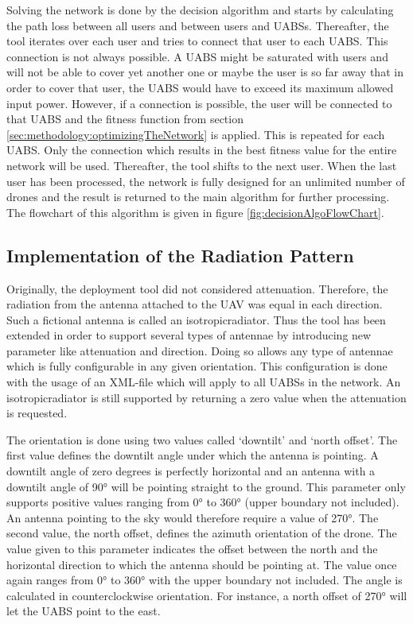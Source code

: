 \begin{minipage}{0.4\textwidth}\vspace{-120pt}%
Solving the network is done by the decision algorithm and starts by calculating the path loss between all users and between users and \gls{UABS}s.
Thereafter, the tool iterates over each user and tries to connect that user to each \gls{UABS}. This connection is not always possible. A \gls{UABS} might be saturated with users and 
will not be able to cover yet another one or maybe the user is so far away that in order to cover that user, the \gls{UABS} would have to exceed its maximum allowed input power.
However, if a connection is possible, the user will be connected to that \gls{UABS} and the fitness function from section \ref{sec:methodology:optimizingTheNetwork} is applied. 
This is repeated for each \gls{UABS}. Only the connection which results in the best fitness value for the entire network will be used. Thereafter, the tool shifts to the next user. 
When the last user has been processed, the network is fully designed for an unlimited number of drones and the result is returned to the main algorithm for further processing.
The flowchart of this algorithm is given in figure \ref{fig:decisionAlgoFlowChart}.
\end{minipage}

\FloatBarrier
\subsection{Implementation of the Radiation Pattern}
\label{subsec:implementationradpat}

Originally, the deployment tool  did not considered attenuation. 
Therefore, the radiation from the antenna attached to the \gls{UAV} 
was equal in each direction. Such a fictional antenna is called an \gls{isotropicradiator}. 
Thus the tool has been extended in order 
to support several types of antennae by introducing new parameter like attenuation and direction.
Doing so allows any type of antennae which is fully configurable in any given orientation.
This configuration is done with the usage of an XML-file which will apply to all \gls{UABS}s in the network.
An \gls{isotropicradiator} is still supported by returning 
a zero value when the attenuation is requested.

The orientation is done using two values called `downtilt' and `north offset'. The first value
defines the downtilt angle under which the antenna is pointing. A downtilt angle of zero degrees is perfectly horizontal and 
an antenna with a downtilt angle of \ang{90} will be pointing straight to the ground.
This parameter only supports positive values ranging from \ang{0} to \ang{360} (upper boundary not included). An antenna pointing to the sky would therefore require a value of \ang{270}.
The second value, the north offset, defines the azimuth orientation of the drone. The value given to this parameter indicates the offset between the north
and the horizontal direction to which the antenna should be pointing at. The value once again ranges from \ang{0} to \ang{360} with the upper boundary not included. The
angle is calculated in counterclockwise orientation. For instance, a north offset of \ang{270} will let the \gls{UABS} point to the east.  

